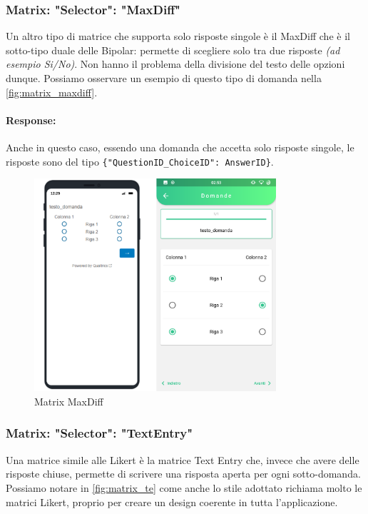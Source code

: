\clearpage
\subsubsection{Matrix: "Selector": "MaxDiff"}
Un altro tipo di matrice che supporta solo risposte singole è il MaxDiff che è il sotto-tipo duale delle Bipolar: permette di scegliere solo tra due risposte \textit{(ad esempio Si/No)}. Non hanno il problema della divisione del testo delle opzioni dunque. Possiamo osservare un esempio di questo tipo di domanda nella \autoref{fig:matrix_maxdiff}.

\paragraph{Response:}
Anche in questo caso, essendo una domanda che accetta solo risposte singole, le risposte sono del tipo \texttt{\{"QuestionID\_ChoiceID": AnswerID\}}.

\begin{figure}[h!]
\centering
\includegraphics[width=0.8\textwidth]{img/matrix_maxdiff}
\caption{Matrix MaxDiff}
\label{fig:matrix_maxdiff}
\end{figure}

\clearpage
\subsubsection{Matrix: "Selector": "TextEntry"}
Una matrice simile alle Likert è la matrice Text Entry che, invece che avere delle risposte chiuse, permette di scrivere una risposta aperta per ogni sotto-domanda. Possiamo notare in \autoref{fig:matrix_te} come anche lo stile adottato richiama molto le matrici Likert, proprio per creare un design coerente in tutta l'applicazione.

